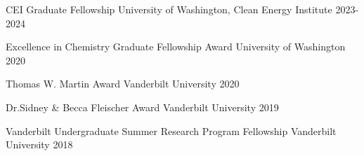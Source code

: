



\begin{cvhonors}


\cvhonor
{CEI Graduate Fellowship}%
{University of Washington, Clean Energy Institute} %
{} %
{2023-2024} %


\cvhonor
{Excellence in Chemistry Graduate Fellowship Award}%
{University of Washington} %
{} %
{2020} %


\cvhonor
{Thomas W. Martin Award} %
{Vanderbilt University}%
{} %
{2020} %


\cvhonor
{Dr.Sidney \& Becca Fleischer Award}%
{Vanderbilt University} %
{} %
{2019} %


\cvhonor
{Vanderbilt Undergraduate Summer Research Program Fellowship} %
{Vanderbilt University} %
{} %
{2018} %


\end{cvhonors}
\vspace{-1cm}
